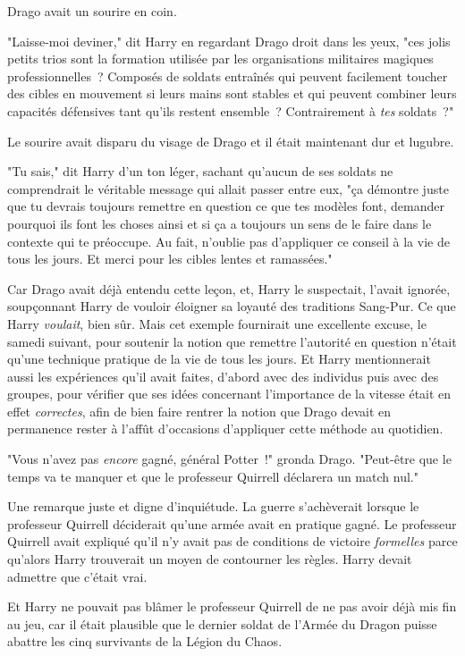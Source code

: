 Drago avait un sourire en coin.

"Laisse-moi deviner," dit Harry en regardant Drago droit dans les yeux, "ces jolis petits trios sont la formation utilisée par les organisations militaires magiques professionnelles~? Composés de soldats entraînés qui peuvent facilement toucher des cibles en mouvement si leurs mains sont stables et qui peuvent combiner leurs capacités défensives tant qu'ils restent ensemble~? Contrairement à \emph{tes} soldats~?"

Le sourire avait disparu du visage de Drago et il était maintenant dur et lugubre.

"Tu sais," dit Harry d'un ton léger, sachant qu'aucun de ses soldats ne comprendrait le véritable message qui allait passer entre eux, "ça démontre juste que tu devrais toujours remettre en question ce que tes modèles font, demander pourquoi ils font les choses ainsi et si ça a toujours un sens de le faire dans le contexte qui te préoccupe. Au fait, n'oublie pas d'appliquer ce conseil à la vie de tous les jours. Et merci pour les cibles lentes et ramassées."

Car Drago avait déjà entendu cette leçon, et, Harry le suspectait, l'avait ignorée, soupçonnant Harry de vouloir éloigner sa loyauté des traditions Sang-Pur. Ce que Harry \emph{voulait}, bien sûr. Mais cet exemple fournirait une excellente excuse, le samedi suivant, pour soutenir la notion que remettre l'autorité en question n'était qu'une technique pratique de la vie de tous les jours. Et Harry mentionnerait aussi les expériences qu'il avait faites, d'abord avec des individus puis avec des groupes, pour vérifier que ses idées concernant l'importance de la vitesse était en effet \emph{correctes}, afin de bien faire rentrer la notion que Drago devait en permanence rester à l'affût d'occasions d'appliquer cette méthode au quotidien.

"Vous n'avez pas \emph{encore} gagné, général Potter~!" gronda Drago. "Peut-être que le temps va te manquer et que le professeur Quirrell déclarera un match nul."

Une remarque juste et digne d'inquiétude. La guerre s'achèverait lorsque le professeur Quirrell déciderait qu'une armée avait en pratique gagné. Le professeur Quirrell avait expliqué qu'il n'y avait pas de conditions de victoire \emph{formelles} parce qu'alors Harry trouverait un moyen de contourner les règles. Harry devait admettre que c'était vrai.

Et Harry ne pouvait pas blâmer le professeur Quirrell de ne pas avoir déjà mis fin au jeu, car il était plausible que le dernier soldat de l'Armée du Dragon puisse abattre les cinq survivants de la Légion du Chaos.


